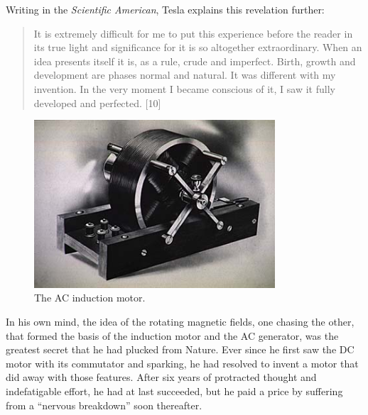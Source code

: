 \documentclass[
  11pt,
  a4paper,
]{article}
\begin{document}
Writing in the \emph{Scientific American}, Tesla explains this
revelation further:

\begin{quote}
It is extremely difficult for me to put this experience before the
reader in its true light and significance for it is so altogether
extraordinary. When an idea presents itself it is, as a rule, crude and
imperfect. Birth, growth and development are phases normal and natural.
It was different with my invention. In the very moment I became
conscious of it, I saw it fully developed and perfected. {[}10{]}
\end{quote}

\begin{figure}
\hypertarget{fig:ac-motor}{%
\centering
\includegraphics[width=0.8\textwidth,height=\textheight]{images/acmot_main02.jpg}
\caption[The AC induction motor.]{The AC induction
motor.\footnotemark{}}\label{fig:ac-motor}
}
\end{figure}

In his own mind, the idea of the rotating magnetic fields, one chasing
the other, that formed the basis of the induction motor and the AC
generator, was the greatest secret that he had plucked from Nature. Ever
since he first saw the DC motor with its commutator and sparking, he had
resolved to invent a motor that did away with those features. After six
years of protracted thought and indefatigable effort, he had at last
succeeded, but he paid a price by suffering from a ``nervous breakdown''
soon thereafter.
\end{document}
